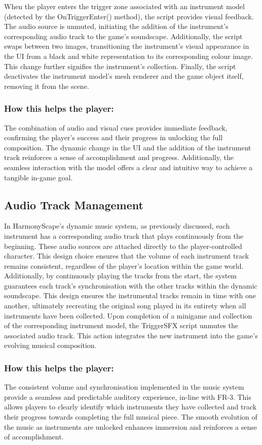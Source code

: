\documentclass{l4proj}
\begin{document}
When the player enters the trigger zone associated with an instrument model (detected by the OnTriggerEnter() method), the script provides visual feedback. The audio source is unmuted, initiating the addition of the instrument's corresponding audio track to the game's soundscape. Additionally, the script swaps between two images, transitioning the instrument's visual appearance in the UI from a black and white representation to its corresponding colour image. This change further signifies the instrument's collection. Finally, the script deactivates the instrument model's mesh renderer and the game object itself, removing it from the scene.
    
\subsubsection{How this helps the player:}
The combination of audio and visual cues provides immediate feedback, confirming the player's success and their progress in unlocking the full composition. The dynamic change in the UI and the addition of the instrument track reinforces a sense of accomplishment and progress. Additionally, the seamless interaction with the model offers a clear and intuitive way to achieve a tangible in-game goal.

\subsection{Audio Track Management}
In HarmonyScape's dynamic music system, as previously discussed, each instrument has a corresponding audio track that plays continuously from the beginning. These audio sources are attached directly to the player-controlled character. This design choice ensures that the volume of each instrument track remains consistent, regardless of the player's location within the game world.  Additionally, by continuously playing the tracks from the start, the system guarantees each track's synchronisation with the other tracks within the dynamic soundscape. This design ensures the instrumental tracks remain in time with one another, ultimately recreating the original song played in its entirety when all instruments have been collected. Upon completion of a minigame and collection of the corresponding instrument model, the TriggerSFX script unmutes the associated audio track. This action integrates the new instrument into the game's evolving musical composition.

\subsubsection{How this helps the player:}
The consistent volume and synchronisation implemented in the music system provide a seamless and predictable auditory experience, in-line with FR-3. This allows players to clearly identify which instruments they have collected and track their progress towards completing the full musical piece. The smooth evolution of the music as instruments are unlocked enhances immersion and reinforces a sense of accomplishment.
\end{document}
